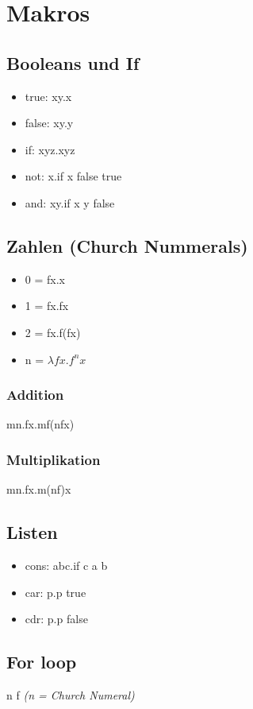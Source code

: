 \section{Makros}

\subsection{Booleans und If}
\begin{itemize}
    \item true: \lambda xy.x
    \item false: \lambda xy.y
    \item if: \lambda xyz.xyz
    \item not: \lambda x.if x false true
    \item and: \lambda xy.if x y false
\end{itemize}

\subsection{Zahlen (Church Nummerals)}
\begin{itemize}
    \item 0 = \lambda fx.x
    \item 1 = \lambda fx.fx
    \item 2 = \lambda fx.f(fx)
    \item n = $\lambda fx.f^nx$
\end{itemize}

\subsubsection{Addition}
\lambda mn.\lambda fx.mf(nfx)

\subsubsection{Multiplikation}
\lambda mn.\lambda fx.m(nf)x

\subsection{Listen}
\begin{itemize}
    \item cons: \lambda abc.if c a b
    \item car: \lambda p.p true
    \item cdr: \lambda p.p false
\end{itemize}

\subsection{For loop}
n f \textit{(n = Church Numeral)}
